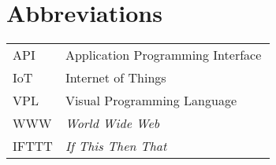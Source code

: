 \chapter*{Abbreviations}


\begin{flushleft}
\begin{tabular}{l p{0.8\linewidth}}
API      & Application Programming Interface\\
IoT      & Internet of Things\\
VPL      & Visual Programming Language\\
WWW      & \textit{World Wide Web}\\
IFTTT    & \textit{If This Then That}
\end{tabular}
\end{flushleft}


